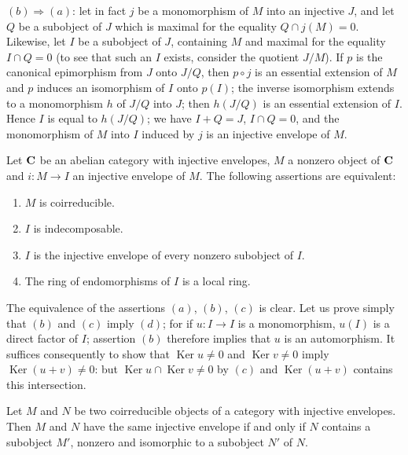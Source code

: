 $(b)\Rightarrow(a)$: let in fact $j$ be a monomorphism of $M$ into an
injective $J$, and let $Q$ be a subobject of $J$ which is maximal for
the equality $Q\cap j(M) = 0$. Likewise, let $I$ be a subobject of $J$,
containing $M$ and maximal for the equality $I\cap Q = 0$ (to see that
such an $I$ exists, consider the quotient $J/M$). If $p$ is the
canonical epimorphism from $J$ onto $J/Q$, then $p\circ j$ is an
essential extension of $M$ and $p$ induces an isomorphism of $I$ onto
$p(I)$; the inverse isomorphism extends to a monomorphism $h$ of
$J/Q$ into $J$; then $h(J/Q)$ is an essential extension of $I$. Hence
$I$ is equal to $h(J/Q)$; we have $I + Q = J$, $I\cap Q = 0$, and the
monomorphism of $M$ into $I$ induced by $j$ is an injective envelope of
$M$.

\begin{proposition}
Let $\mathbf{C}$ be an abelian category with injective envelopes, $M$ a
nonzero object of $\mathbf{C}$ and $i\colon M\to I$ an injective envelope of
$M$. The following assertions are equivalent:
\begin{enumerate}
\item[a.] $M$ is coirreducible.
\item[b.] $I$ is indecomposable.
\item[c.] $I$ is the injective envelope of every nonzero subobject of
      $I$.
\item[d.] The ring of endomorphisms of $I$ is a local ring.
\end{enumerate}
\end{proposition}

The equivalence of the assertions $(a)$, $(b)$, $(c)$ is clear. Let us
prove simply that $(b)$ and $(c)$ imply $(d)$; for if
$u\colon I\to I$ is a monomorphism, $u(I)$ is a direct factor of $I$;
assertion $(b)$ therefore implies that $u$ is an automorphism. It
suffices consequently to show that
$\operatorname{Ker}u \neq 0$ and $\operatorname{Ker}v \neq 0$ imply
$\operatorname{Ker}(u + v) \neq 0$: but
$\operatorname{Ker}u\cap\operatorname{Ker}v \neq 0$ by $(c)$ and
$\operatorname{Ker}(u + v)$ contains this intersection.

\begin{unnumberedcorollary}
Let $M$ and $N$ be two coirreducible objects of a category with injective
envelopes. Then $M$ and $N$ have the same injective envelope if and only
if $N$ contains a subobject $M'$, nonzero and isomorphic to a subobject
$N'$ of $N$.
\end{unnumberedcorollary}

